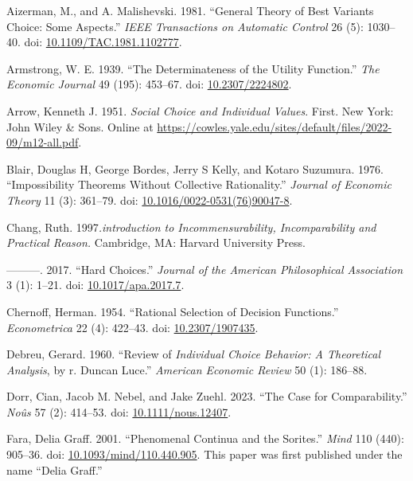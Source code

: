 \documentclass[
  11pt,
  letterpaper,
  DIV=11,
  numbers=noendperiod,
  twoside]{scrartcl}
\newlength{\cslhangindent}
\newenvironment{CSLReferences}[2] %
 {\begin{list}{}{%
  \setlength{\itemindent}{0pt}
  \setlength{\leftmargin}{0pt}
  \setlength{\parsep}{0pt}
  \ifodd #1
   \setlength{\leftmargin}{\cslhangindent}
   \setlength{\itemindent}{-1\cslhangindent}
  \fi
  \setlength{\itemsep}{#2\baselineskip}}}
 {\end{list}}
\begin{document}
\label{refs}
\begin{CSLReferences}{1}{0}
Aizerman, M., and A. Malishevski. 1981. {``General Theory of Best
Variants Choice: Some Aspects.''} \emph{IEEE Transactions on Automatic
Control} 26 (5): 1030--40. doi:
\href{https://doi.org/10.1109/TAC.1981.1102777}{10.1109/TAC.1981.1102777}.

Armstrong, W. E. 1939. {``The Determinateness of the Utility
Function.''} \emph{The Economic Journal} 49 (195): 453--67. doi:
\href{https://doi.org/10.2307/2224802}{10.2307/2224802}.

Arrow, Kenneth J. 1951. \emph{Social Choice and Individual Values}.
First. New York: John Wiley \& Sons. Online at
\url{https://cowles.yale.edu/sites/default/files/2022-09/m12-all.pdf}.

Blair, Douglas H, George Bordes, Jerry S Kelly, and Kotaro Suzumura.
1976. {``Impossibility Theorems Without Collective Rationality.''}
\emph{Journal of Economic Theory} 11 (3): 361--79. doi:
\href{https://doi.org/10.1016/0022-0531(76)90047-8}{10.1016/0022-0531(76)90047-8}.

Chang, Ruth. 1997\emph{.introduction to Incommensurability,
Incomparability and Practical Reason.} Cambridge, MA: Harvard University
Press.

---------. 2017. {``Hard Choices.''} \emph{Journal of the American
Philosophical Association} 3 (1): 1--21. doi:
\href{https://doi.org/10.1017/apa.2017.7}{10.1017/apa.2017.7}.

Chernoff, Herman. 1954. {``Rational Selection of Decision Functions.''}
\emph{Econometrica} 22 (4): 422--43. doi:
\href{https://doi.org/10.2307/1907435}{10.2307/1907435}.

Debreu, Gerard. 1960. {``Review of \emph{Individual Choice Behavior: A
Theoretical Analysis}, by r. Duncan Luce.''} \emph{American Economic
Review} 50 (1): 186--88.

Dorr, Cian, Jacob M. Nebel, and Jake Zuehl. 2023. {``The Case for
Comparability.''} \emph{Noûs} 57 (2): 414--53. doi:
\href{https://doi.org/10.1111/nous.12407}{10.1111/nous.12407}.

Fara, Delia Graff. 2001. {``Phenomenal Continua and the Sorites.''}
\emph{Mind} 110 (440): 905--36. doi:
\href{https://doi.org/10.1093/mind/110.440.905}{10.1093/mind/110.440.905}.
This paper was first published under the name {``Delia Graff.''}


\end{CSLReferences}
\end{document}
